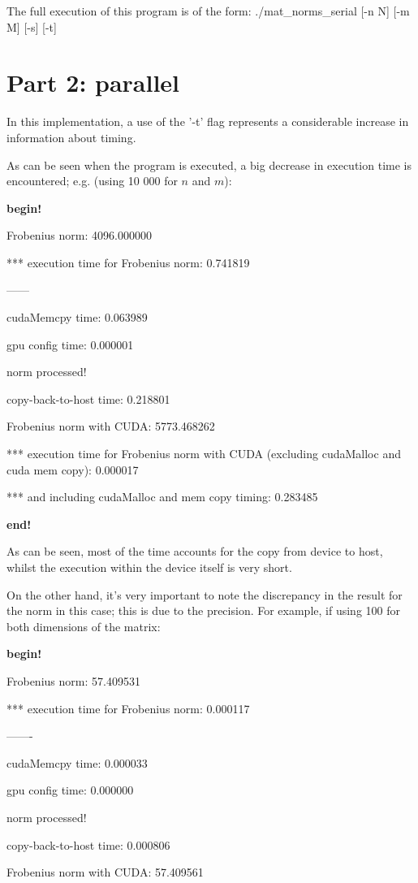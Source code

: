 \documentclass[paper=a4, fontsize=11pt]{scrartcl} %
\numberwithin{equation}{section} %
\numberwithin{figure}{section} %
\numberwithin{table}{section} %
\begin{document}
The full execution of this program is of the form: ./mat\_norms\_serial [-n N] [-m M] [-s] [-t]


\section{Part 2: parallel}

In this implementation, a use of the '-t' flag represents a considerable increase in information about timing.

As can be seen when the program is executed, a big decrease in execution time is encountered; e.g. (using 10 000 for $n$ and $m$):

\textbf{begin!}

Frobenius norm: 4096.000000

*** execution time for Frobenius norm: 0.741819

------

cudaMemcpy time: 0.063989

gpu config time: 0.000001

norm processed!

copy-back-to-host time: 0.218801

Frobenius norm with CUDA: 5773.468262

*** execution time for Frobenius norm with CUDA (excluding cudaMalloc and cuda mem copy): 0.000017

*** and including cudaMalloc and mem copy timing: 0.283485

\textbf{end!}

As can be seen, most of the time accounts for the copy from device to host, whilst the execution within the device itself is very short.

On the other hand, it's very important to note the discrepancy in the result for the norm in this case; this is due to the precision. For example, if using 100 for both dimensions of the matrix:

\textbf{begin!}

Frobenius norm: 57.409531

*** execution time for Frobenius norm: 0.000117

-------

cudaMemcpy time: 0.000033

gpu config time: 0.000000

norm processed!

copy-back-to-host time: 0.000806

Frobenius norm with CUDA: 57.409561
\end{document}
